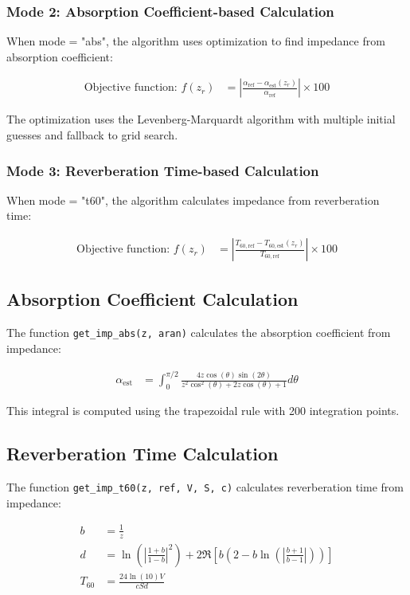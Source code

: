 \documentclass{article}
\begin{document}
\subsubsection{Mode 2: Absorption Coefficient-based Calculation}
When mode = "abs", the algorithm uses optimization to find impedance from absorption coefficient:

\begin{align}
\text{Objective function: } f(z_r) &= \left|\frac{\alpha_{\text{ref}} - \alpha_{\text{est}}(z_r)}{\alpha_{\text{ref}}}\right| \times 100
\end{align}

The optimization uses the Levenberg-Marquardt algorithm with multiple initial guesses and fallback to grid search.

\subsubsection{Mode 3: Reverberation Time-based Calculation}
When mode = "t60", the algorithm calculates impedance from reverberation time:

\begin{align}
\text{Objective function: } f(z_r) &= \left|\frac{T_{60,\text{ref}} - T_{60,\text{est}}(z_r)}{T_{60,\text{ref}}}\right| \times 100
\end{align}

\subsection{Absorption Coefficient Calculation}
The function \texttt{get\_imp\_abs(z, aran)} calculates the absorption coefficient from impedance:

\begin{align}
\alpha_{\text{est}} &= \int_0^{\pi/2} \frac{4z\cos(\theta)\sin(2\theta)}{z^2\cos^2(\theta) + 2z\cos(\theta) + 1} d\theta
\end{align}

This integral is computed using the trapezoidal rule with 200 integration points.

\subsection{Reverberation Time Calculation}
The function \texttt{get\_imp\_t60(z, ref, V, S, c)} calculates reverberation time from impedance:

\begin{align}
b &= \frac{1}{z} \\
d &= \ln\left(\left|\frac{1 + b}{1 - b}\right|^2\right) + 2\Re\left[b\left(2 - b\ln\left(\left|\frac{b + 1}{b - 1}\right|\right)\right)\right] \\
T_{60} &= \frac{24\ln(10)V}{cSd}
\end{align}
\end{document}
